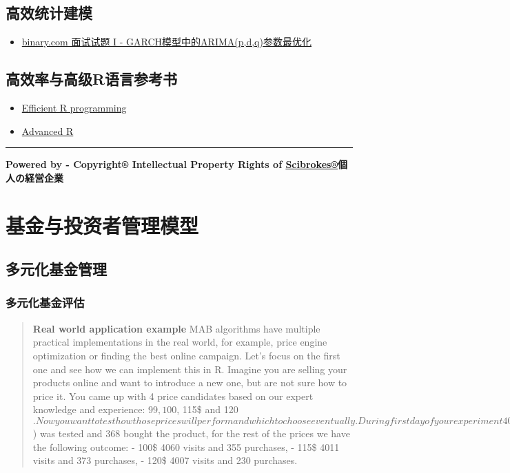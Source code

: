 \documentclass[]{book}
\providecommand{\tightlist}{%
  \setlength{\itemsep}{0pt}\setlength{\parskip}{0pt}}
\theoremstyle{definition}
\theoremstyle{definition}
\theoremstyle{definition}
\theoremstyle{remark}
\begin{document}
\section{高效统计建模}

\begin{itemize}
\tightlist
\item
  \href{http://rpubs.com/englianhu/binary-Q1FiGJRGARCH}{binary.com
  面试试题 I - GARCH模型中的ARIMA(p,d,q)参数最优化}
\end{itemize}

\section{高效率与高级R语言参考书}\label{r}

\begin{itemize}
\tightlist
\item
  \href{https://csgillespie.github.io/efficientR/}{Efficient R
  programming}
\item
  \href{http://adv-r.had.co.nz}{Advanced R}
\end{itemize}

\begin{center}\rule{0.5\linewidth}{\linethickness}\end{center}

\textbf{Powered by - Copyright® Intellectual Property Rights of
\href{http://www.scibrokes.com}{Scibrokes®}個人の経営企業}

\chapter{基金与投资者管理模型}\label{fund}

\section{多元化基金管理}

\subsection{多元化基金评估}

\begin{quote}
\textbf{Real world application example} MAB algorithms have multiple
practical implementations in the real world, for example, price engine
optimization or finding the best online campaign. Let's focus on the
first one and see how we can implement this in R. Imagine you are
selling your products online and want to introduce a new one, but are
not sure how to price it. You came up with 4 price candidates based on
our expert knowledge and experience: 99\(, 100\), 115\$ and
120\(. Now you want to test how those prices will perform and which to choose eventually. During first day of your experiment 4000 people visited your shop when the first price (99\))
was tested and 368 bought the product, for the rest of the prices we
have the following outcome: - 100\$ 4060 visits and 355 purchases, -
115\$ 4011 visits and 373 purchases, - 120\$ 4007 visits and 230
purchases.
\end{quote}
\end{document}
